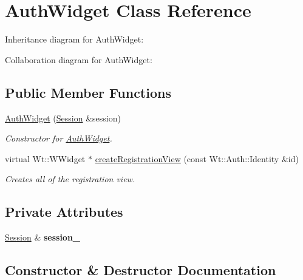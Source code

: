 \hypertarget{classAuthWidget}{}\section{Auth\+Widget Class Reference}
\label{classAuthWidget}


Inheritance diagram for Auth\+Widget\+:


Collaboration diagram for Auth\+Widget\+:
\subsection*{Public Member Functions}
\begin{DoxyCompactItemize}
\item 
\hyperlink{classAuthWidget_a16b0f0ad98e79aa40992cfaa9a00cfde}{Auth\+Widget} (\hyperlink{classSession}{Session} \&session)
\begin{DoxyCompactList}\small\item\em Constructor for \hyperlink{classAuthWidget}{Auth\+Widget}. \end{DoxyCompactList}\item 
virtual Wt\+::\+W\+Widget $\ast$ \hyperlink{classAuthWidget_abfa295703272e72a5d57dd736cc9f329}{create\+Registration\+View} (const Wt\+::\+Auth\+::\+Identity \&id)
\begin{DoxyCompactList}\small\item\em Creates all of the registration view. \end{DoxyCompactList}\end{DoxyCompactItemize}
\subsection*{Private Attributes}
\begin{DoxyCompactItemize}
\item 
\hyperlink{classSession}{Session} \& {\bfseries session\+\_\+}\hypertarget{classAuthWidget_a9c1a0d3bf5d59ec8f0f6c7672e37224c}{}\label{classAuthWidget_a9c1a0d3bf5d59ec8f0f6c7672e37224c}

\end{DoxyCompactItemize}


\subsection{Constructor \& Destructor Documentation}
